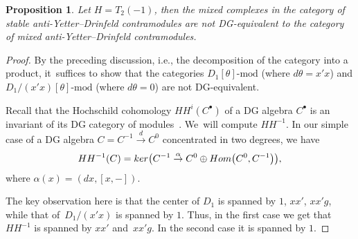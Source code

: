 \documentclass[11pt]{article}
\numberwithin{equation}{section}
\numberwithin{equation}{section}
\newtheorem{Proposition}[Theorem]{Proposition}
\begin{document}
\begin{Proposition}\label{notsscase}
Let $H=T_2(-1)$, then the mixed complexes in the category of stable anti-Yetter--Drinfeld contramodules are not DG-equivalent to the category of mixed anti-Yetter--Drinfeld contramodules.
\end{Proposition}
\begin{proof}
By the preceding discussion, i.e., the decomposition of the category into a product, it~suf\-fices to show that the categories $D_1[\theta]\text{-mod}$ (where $d\theta=x'x$) and $D_1/(x'x)[\theta]\text{-mod}$ (where $d\theta =0$) are not DG-equivalent.

Recall that the Hochschild cohomology $HH^i(C^\bullet)$ of a DG algebra $C^\bullet$ is an invariant of its DG category of modules~\cite{dginvar}. We~will compute $HH^{-1}$. In our simple case of a DG algebra $C=C^{-1}\stackrel{d}{\to} C^0$ concentrated in two degrees, we have
\begin{gather}
HH^{-1}(C)={\rm ker} \big(C^{-1}\stackrel{\alpha}{\to} C^0\oplus {\rm Hom}\big(C^0, C^{-1}\big)\big),
\end{gather}
where $\alpha(x)=(dx, [x,-])$.

The key observation here is that the center of $D_1$ is spanned by $1$, $xx'$, $xx'g$, while that of~$D_1/(x'x)$ is spanned by $1$. Thus, in the first case we get that $HH^{-1}$ is spanned by $xx'$ and~$xx'g$. In the second case it is spanned by $1$.
\end{proof}
\end{document}
